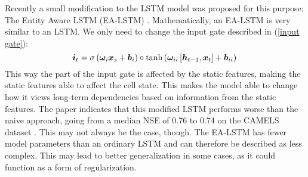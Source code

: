 Recently a small modification to the LSTM model was proposed for this purpose:
The Entity Aware LSTM (EA-LSTM) \citep{lstm_second_paper}. 
Mathematically, an EA-LSTM is very similar to an LSTM. We only need to change the 
input gate described in (\ref{input gate}): 
\begin{equation}
    \bm{i}_t = \sigma\left(\bm{\omega}_i  \bm{x}_s + \bm{b}_i\right) \circ \tanh\left(\bm{\omega}_{ii}\left[ \bm{h}_{t-1},\bm{x}_t  \right] + \bm{b}_{ii}\right) \label{EA-LSTM input gate}\\
\end{equation}
This way the part of the input gate is affected by the static features, making 
the static features able to affect the cell state. This makes the model able to 
change how it views long-term dependencies based on information from the static features. 
The paper 
indicates that this modified LSTM performs worse than the naive approach, going 
from a median NSE of 0.76 to 0.74 on the CAMELS dataset \citep{CAMELS_US}. 
This may not always be the case, though. 
The EA-LSTM has fewer model parameters than an ordinary LSTM and can therefore 
be described as less complex. This may lead to better generalization in some cases, as it could 
function as a form of regularization.
